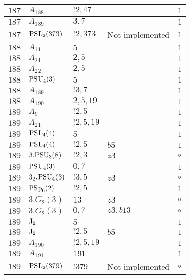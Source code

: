 \documentclass[a4paper, 11pt]{article}
\begin{document}
\begin{longtable}{lllll}
        $ 187 $ & $ A_{188} $ & $ !2, 47 $ & $ ~ $ & $ 1$ \\ \hline
        $ 187 $ & $ A_{189} $ & $ 3, 7 $ & $ ~ $ & $ 1$ \\ \hline
        $ 187 $ & $ {\rm PSL}_{2}(373) $ & $ !2, 373 $ &  Not implemented & $ 1$ \\ \hline
        $ 188 $ & $ A_{11} $ & $ 5 $ & $ ~ $ & $ 1$ \\ \hline
        $ 188 $ & $ A_{21} $ & $ 2,5 $ & $ ~ $ & $ 1$ \\ \hline
        $ 188 $ & $ A_{22} $ & $ 2,5 $ & $ ~ $ & $ 1$ \\ \hline
        $ 188 $ & $ {\rm PSU}_{4}(3) $ & $ 5 $ & $ ~ $ & $ 1$ \\ \hline
        $ 188 $ & $ A_{189} $ & $ !3, 7 $ & $ ~ $ & $ 1$ \\ \hline
        $ 188 $ & $ A_{190} $ & $ 2, 5, 19 $ & $ ~ $ & $ 1$ \\ \hline
        $ 189 $ & $ A_{9} $ & $ ! 2,5 $ & $ ~ $ & $ 1$ \\ \hline
        $ 189 $ & $ A_{21} $ & $ ! 2,5,19 $ & $ ~ $ & $ 1$ \\ \hline
        $ 189 $ & $ {\rm PSL}_{4}(4) $ & $ 5 $ & $ ~ $ & $ 1$ \\ \hline
        $ 189 $ & $ {\rm PSL}_{4}(4) $ & $ ! 2,5 $ & $ b5 $ & $ 1$ \\ \hline
        $ 189 $ & $ 3.{\rm PSU}_{3}(8) $ & $ ! 2,3 $ & $ z3 $ &  $\circ$ \\ \hline
        $ 189 $ & $ {\rm PSU}_{4}(3) $ & $ 0,7 $ & $ ~ $ & $ 1$ \\ \hline
        $ 189 $ & $ 3_2.{\rm PSU}_{4}(3) $ & $ ! 3,5 $ & $ z3 $ &  $\circ$ \\ \hline
        $ 189 $ & $ {\rm PSp}_{6}(2) $ & $ ! 2,5 $ & $ ~ $ & $ 1$ \\ \hline
        $ 189 $ & $ 3.G_{2}(3) $ & $ 13 $ & $ z3 $ &  $\circ$ \\ \hline
        $ 189 $ & $ 3.G_{2}(3) $ & $ 0,7 $ & $ z3,b13 $ &  $\circ$ \\ \hline
        $ 189 $ & $ {\rm J}_2 $ & $ 5 $ & $ ~ $ & $ 1$ \\ \hline
        $ 189 $ & $ {\rm J}_2 $ & $ ! 2,5 $ & $ b5 $ & $ 1$ \\ \hline
        $ 189 $ & $ A_{190} $ & $ !2, 5, 19 $ & $ ~ $ & $ 1$ \\ \hline
        $ 189 $ & $ A_{191} $ & $ 191 $ & $ ~ $ & $ 1$ \\ \hline
        $ 189 $ & $ {\rm PSL}_{2}(379) $ & $ !379 $ &  Not implemented &  $\circ$ \\ \hline

\end{longtable}
\end{document}
